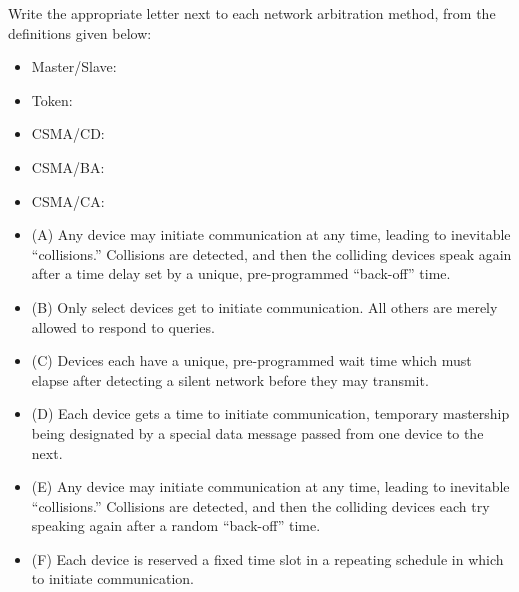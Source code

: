 

Write the appropriate letter next to each network arbitration method, from the definitions given below:

\vskip 10pt

\begin{itemize}
\item{} Master/Slave: \underbar{\hskip 50pt}
\vskip 10pt
\item{} Token: \underbar{\hskip 50pt}
\vskip 10pt
\item{} CSMA/CD: \underbar{\hskip 50pt}
\vskip 10pt
\item{} CSMA/BA: \underbar{\hskip 50pt}
\vskip 10pt
\item{} CSMA/CA: \underbar{\hskip 50pt}
\end{itemize}

\vskip 20pt

\begin{itemize}
\item{(A)} Any device may initiate communication at any time, leading to inevitable ``collisions.'' Collisions are detected, and then the colliding devices speak again after a time delay set by a unique, pre-programmed ``back-off'' time.
\item{(B)} Only select devices get to initiate communication.  All others are merely allowed to respond to queries.
\item{(C)} Devices each have a unique, pre-programmed wait time which must elapse after detecting a silent network before they may transmit.
\item{(D)} Each device gets a time to initiate communication, temporary mastership being designated by a special data message passed from one device to the next.
\item{(E)} Any device may initiate communication at any time, leading to inevitable ``collisions.''  Collisions are detected, and then the colliding devices each try speaking again after a random ``back-off'' time.
\item{(F)} Each device is reserved a fixed time slot in a repeating schedule in which to initiate communication.
\end{itemize}






